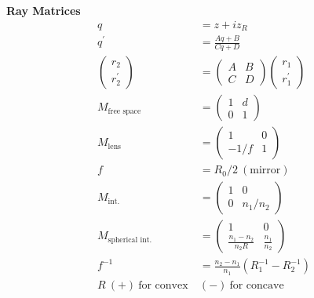 \documentclass[12pt]{article}
\begin{document}
\begin{multicols}{2}
\textbf{Ray Matrices}
\begin{align}
  q &= z + iz_R\\
  q^{\prime} &= \frac{Aq + B}{Cq + D}\\
  \begin{pmatrix}r_2\\r_2^{\prime}\end{pmatrix} &=
  \begin{pmatrix} A & B\\C & D\end{pmatrix}
  \begin{pmatrix} r_1\\r_1^{\prime}\end{pmatrix}\\
  M_{\textrm{free space}} &= \begin{pmatrix}1 & d\\0 & 1\end{pmatrix}\\
  M_{\textrm{lens}} &= \begin{pmatrix}1 & 0\\-1/f & 1\end{pmatrix}\\
  f &= R_0 / 2 \ (\textrm{mirror})\\
  M_{\textrm{int.}} &= \begin{pmatrix}1 & 0\\0 & n_1/n_2\end{pmatrix}\\
    M_{\textrm{spherical int.}} &= \begin{pmatrix}1 & 0\\
      \frac{n_1 - n_2}{n_2R} & \frac{n_1}{n_2}\end{pmatrix}\\
    f^{-1} &= \frac{n_2 - n_1}{n_1}(R^{-1}_1 - R^{-1}_2)\\
    R \ (+) \ \textrm{for convex} \ &(-) \ \textrm{for concave}
\end{align}


\end{multicols}
\end{document}
